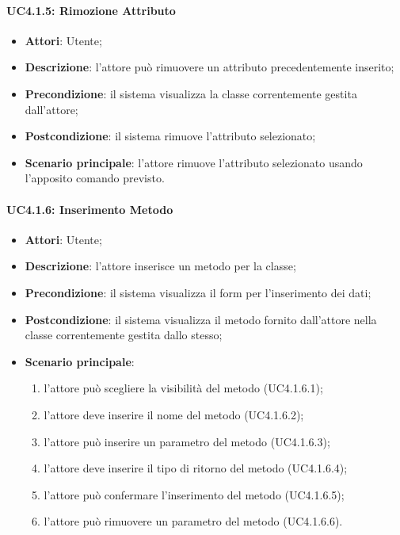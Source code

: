 \paragraph{UC4.1.5: Rimozione Attributo}
\label{UC4.1.5}
\begin{itemize}
\item \textbf{Attori}: Utente;
\item \textbf{Descrizione}: l'attore può rimuovere un attributo precedentemente inserito;
\item \textbf{Precondizione}: il sistema visualizza la classe correntemente gestita dall'attore;
\item \textbf{Postcondizione}: il sistema rimuove l'attributo selezionato;
\item \textbf{Scenario principale}:
l'attore rimuove l'attributo selezionato usando l'apposito comando previsto.
\end{itemize}

\paragraph{UC4.1.6: Inserimento Metodo}
\label{UC4.1.6}
\begin{itemize}
\item \textbf{Attori}: Utente;
\item \textbf{Descrizione}: l'attore inserisce un metodo per la classe;
\item \textbf{Precondizione}: il sistema visualizza il form per l'inserimento dei dati;
\item \textbf{Postcondizione}: il sistema visualizza il metodo fornito dall'attore nella classe correntemente gestita dallo stesso;
\item \textbf{Scenario principale}:
\begin{enumerate}
	\item l'attore può scegliere la visibilità del metodo (UC4.1.6.1);
	\item l'attore deve inserire il nome del metodo (UC4.1.6.2);
	\item l'attore può inserire un parametro del metodo (UC4.1.6.3);
	\item l'attore deve inserire il tipo di ritorno del metodo (UC4.1.6.4);
	\item l'attore può confermare l'inserimento del metodo (UC4.1.6.5);
	\item  l'attore può rimuovere un parametro del metodo (UC4.1.6.6).
\end{enumerate}
\end{itemize}


